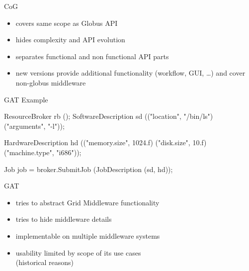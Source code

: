 \documentclass[%
  pdf,
  colorBG,
  slideColor,
  frames,
  ogf
]{prosper}
\newcommand{\dn}{\vspace*{+1em}}
\begin{document}

 \begin{slide}{CoG}

  \dn 

  \begin{itemize}
   \item covers same scope as Globus API
   \item hides complexity and API evolution
   \item separates functional and non functional API parts\\[10mm]
   \item new versions provide additional functionality (workflow, GUI, \dots)
   and cover non-globus middleware
  \end{itemize}

 \end{slide}


 \begin{slide}{GAT Example}

  \begin{mycode}[label=GAT: Job Submit]

  ResourceBroker              rb ();
  SoftwareDescription         sd (("location",  "/bin/ls")
                                  ("arguments", "-l"));

  HardwareDescription         hd (("memory.size",  1024.f)
                                  ("disk.size",    10.f)
                                  ("machine.type", "i686"));

  Job job = broker.SubmitJob (JobDescription (sd, hd));

  \end{mycode}

 \end{slide}


 \begin{slide}{GAT}
 \dn
  \begin{itemize}
   \item tries to abstract Grid Middleware functionality
   \item tries to hide middleware details
   \item implementable on multiple middleware systems\\[2em]
   \item usability limited by scope of its use cases\\ (historical reasons)
  \end{itemize}
 \end{slide}
\end{document}
